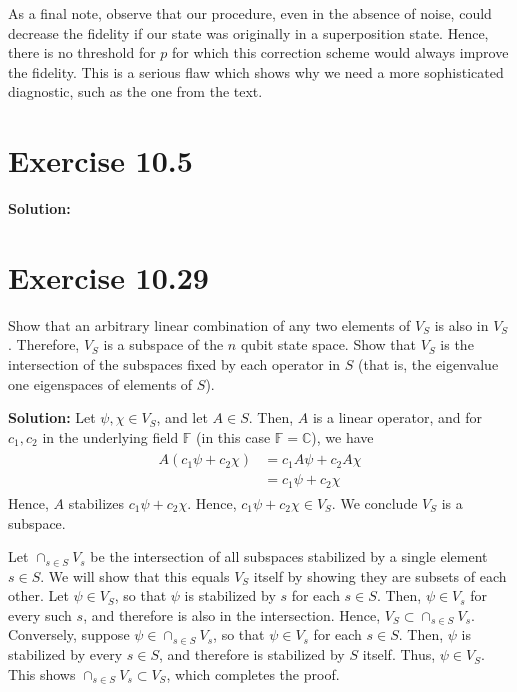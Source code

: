 \documentclass{book}
\begin{document}
    As a final note, observe that our procedure, even in the absence of noise, could decrease the fidelity if our state was originally in a superposition state. Hence, there is no threshold for $p$ for which this correction scheme would always improve the fidelity. This is a serious flaw which shows why we need a more sophisticated diagnostic, such as the one from the text.
    
\section*{Exercise 10.5}
    \textbf{Solution:}
    
\section*{Exercise 10.29}
    Show that an arbitrary linear combination of any two elements of $V_S$ is also in $V_S$ . Therefore, $V_S$ is a subspace of the $n$ qubit state space. Show that $V_S$ is the intersection of the subspaces fixed by each operator in $S$ (that is, the eigenvalue one eigenspaces of elements of $S$).
    
    \textbf{Solution:} Let $\psi, \chi \in V_S$, and let $A \in S$. Then, $A$ is a linear operator, and for $c_1, c_2$ in the underlying field $\mathbb{F}$ (in this case $\mathbb{F}=\mathbb{C}$), we have
    \begin{align}
    \begin{aligned}
        A\left(c_1\psi + c_2\chi\right) &= c_1 A\psi + c_2 A\chi \\
        &=c_1\psi + c_2 \chi
    \end{aligned}
    \end{align}
    Hence, $A$ stabilizes $c_1\psi + c_2\chi$. Hence, $c_1\psi + c_2 \chi\in V_S$. We conclude $V_S$ is a subspace. 
    
    Let $\cap_{s\in S} V_s$ be the intersection of all subspaces stabilized by a single element $s\in S$. We will show that this equals $V_S$ itself by showing they are subsets of each other. Let $\psi \in V_S$, so that $\psi$ is stabilized by $s$ for each $s\in S$. Then, $\psi\in V_s$ for every such $s$, and therefore is also in the intersection. Hence, $V_S \subset \cap_{s\in S} V_s$. Conversely, suppose $\psi \in \cap_{s\in S} V_s$, so that $\psi\in V_s$ for each $s\in S$. Then, $\psi$ is stabilized by every $s \in S$, and therefore is stabilized by $S$ itself. Thus, $\psi \in V_S$. This shows $\cap_{s\in S} V_s \subset V_S$, which completes the proof.
    
\end{document}
